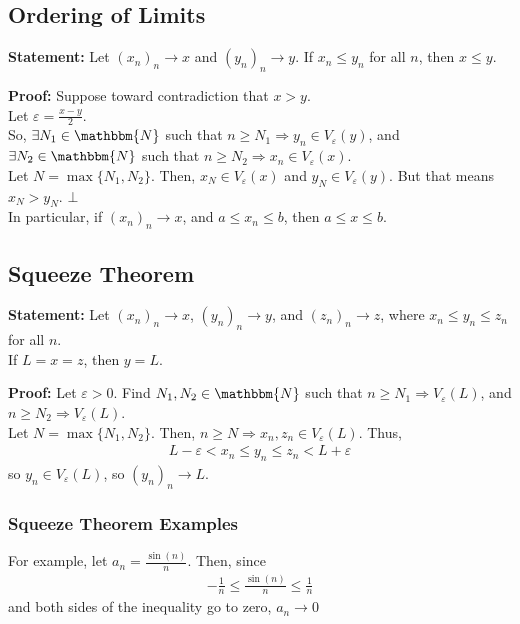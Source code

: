 \documentclass[10pt]{extarticle}
\newcommand{\N}{\mathbbm{N}}
\begin{document}
  \subsection{Ordering of Limits}%
  \textbf{Statement:} Let $(x_n)_n \rightarrow x$ and $(y_n)_n \rightarrow y$. If $x_n \leq y_n$ for all $n$, then $x \leq y$.

  \textbf{Proof:} Suppose toward contradiction that $x > y$.\\
    
    Let $\varepsilon = \frac{x-y}{2}$.\\

    So, $\exists N_1\in\N$ such that $n\geq N_1 \Rightarrow y_n\in V_{\varepsilon}(y)$, and $\exists N_2\in\N$ such that $n\geq N_2 \Rightarrow x_n\in V_{\varepsilon}(x)$.\\
    
    Let $N = \max\{N_1,N_2\}$. Then, $x_N\in V_{\varepsilon}(x)$ and $y_N\in V_{\varepsilon}(y)$. But that means $x_N > y_N$. $\bot$\\

    In particular, if $(x_n)_n \rightarrow x$, and $a \leq x_n \leq b$, then $a\leq x \leq b$.
  \subsection{Squeeze Theorem}%
  \textbf{Statement:} Let $(x_n)_n \rightarrow x$, $(y_n)_n\rightarrow y$, and $(z_n)_n \rightarrow z$, where $x_n \leq y_n \leq z_n$ for all $n$.\\

    If $L = x = z$, then $y = L$.
    
    \textbf{Proof:} Let $\varepsilon > 0$. Find $N_1,N_2\in\N$ such that $n\geq N_1 \Rightarrow V_{\varepsilon}(L)$, and $n\geq N_{2} \Rightarrow V_{\varepsilon}(L)$.\\

    Let $N = \max\{N_1,N_2\}$. Then, $n\geq N \Rightarrow x_n,z_n\in V_{\varepsilon}(L)$. Thus,
    \begin{align*}
      L-\varepsilon < x_n \leq y_n \leq z_n < L + \varepsilon
    \end{align*}
    so $y_n\in V_{\varepsilon}(L)$, so $(y_n)_n \rightarrow L$.\\
    \subsubsection{Squeeze Theorem Examples}%
    
    For example, let $a_n = \frac{\sin(n)}{n}$. Then, since
    \begin{align*}
      -\frac{1}{n} \leq \frac{\sin(n)}{n} \leq \frac{1}{n}
    \end{align*}
    and both sides of the inequality go to zero, $a_n \rightarrow 0$\\
\end{document}
